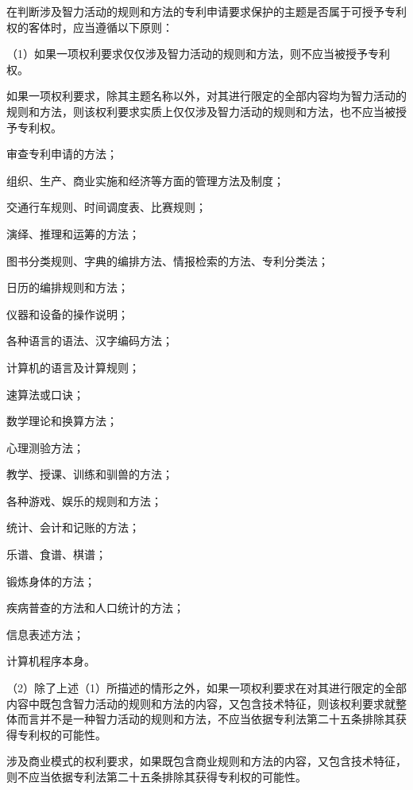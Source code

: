 在判断涉及智力活动的规则和方法的专利申请要求保护的主题是否属于可授予专利权的客体时，应当遵循以下原则：

{\setlength{\parindent}{17.1bp}（1）如果一项权利要求仅仅涉及智力活动的规则和方法，则不应当被授予专利权。\par}

如果一项权利要求，除其主题名称以外，对其进行限定的全部内容均为智力活动的规则和方法，则该权利要求实质上仅仅涉及智力活动的规则和方法，也不应当被授予专利权。

{\par}

审查专利申请的方法；

组织、生产、商业实施和经济等方面的管理方法及制度；

交通行车规则、时间调度表、比赛规则；

演绎、推理和运筹的方法；

图书分类规则、字典的编排方法、情报检索的方法、专利分类法；

日历的编排规则和方法；

仪器和设备的操作说明；

各种语言的语法、汉字编码方法；

计算机的语言及计算规则；

速算法或口诀；

数学理论和换算方法；

心理测验方法；

教学、授课、训练和驯兽的方法；

各种游戏、娱乐的规则和方法；

统计、会计和记账的方法；

乐谱、食谱、棋谱；

锻炼身体的方法；

疾病普查的方法和人口统计的方法；

信息表述方法；

计算机程序本身。

{\setlength{\parindent}{17.1bp}（2）除了上述（1）所描述的情形之外，如果一项权利要求在对其进行限定的全部内容中既包含智力活动的规则和方法的内容，又包含技术特征，则该权利要求就整体而言并不是一种智力活动的规则和方法，不应当依据专利法第二十五条排除其获得专利权的可能性。\par}

{\par}

涉及商业模式的权利要求，如果既包含商业规则和方法的内容，又包含技术特征，则不应当依据专利法第二十五条排除其获得专利权的可能性。

